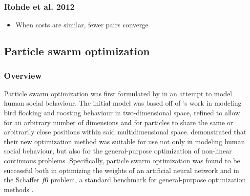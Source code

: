 \documentclass[12pt,a4paper]{article}
\begin{document}
\subsubsection{Rohde et al. 2012}
\begin{itemize}
\item When costs are similar, fewer pairs converge
\end{itemize}


\subsection{Particle swarm optimization}
\subsubsection{Overview}
Particle swarm optimization was first formulated by \cite{kennedy1995} in an attempt to model human social behaviour. The initial model was based off of \cite{heppner1990}'s work in modeling bird flocking and roosting behaviour in two-dimensional space, refined to allow for an arbitrary number of dimensions and for particles to share the same or arbitrarily close positions within said multidimensional space. \citeauthor{kennedy1995} demonstrated that their new optimization method was suitable for use not only in modeling human social behaviour, but also for the general-purpose optimization of non-linear continuous problems. Specifically, particle swarm optimization was found to be successful both in optimizing the weights of an artificial neural network and in the Schaffer $f6$ problem, a standard benchmark for general-purpose optimization methods \citep{davis1991}.
\end{document}
